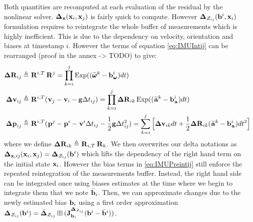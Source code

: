 %
Both quantities are recomputed at each evaluation of the residual by the nonlinear solver. ${\bm \Delta}_{{\bf x}}({\bf x}_i, {\bf x}_j)$ is fairly quick to compute.
However ${\bm \Delta}_{\mathcal{Z}_{ij}}({\bf b}^i, {\bf x}_i)$ formulation requires to reintegrate the whole buffer of measurements which
is highly inefficient. This is due to the dependency on velocity, orientation and biases at timestamp $i$. However the terms of equation \ref{eq:IMUIntij} can 
be rearranged (proof in the annex -> TODO) to give:
%
%
\begin{equation}
    \begin{split}
    {\bm \Delta {\bf R}}_{ij} &\triangleq  \prescript{}{}{{\bf R}}_{}^{i,T} \prescript{}{}{{\bf R}}_{}^{j} =  \prod_{k=i}^{j} \operatorname*{Exp}((\prescript{}{}{\widetilde{\pmb{\omega}}}_{}^k - {\bf b}_{\prescript{}{}{\pmb{\omega}}_{}}^i)dt) \\
    {\bm \Delta {\bf v}}_{ij} &\triangleq \prescript{}{}{{\bf R}}_{}^{i,T} (\prescript{}{}{{\bf v}}_{j} - \prescript{}{}{{\bf v}}_{i} - {\bf g} \Delta t_{ij}) 
    = \prod_{k=i}^{j} {\bm \Delta {\bf R}}_{ik} \operatorname*{Exp}((\prescript{}{}{\widetilde{{\bf a}}}_{}^k - {\bf b}_{\prescript{}{}{{\bf a}}_{}}^i)dt)  \\
    {\bm \Delta {\bf p}}_{ij} &\triangleq \prescript{}{}{{\bf R}}_{}^{i,T}(\prescript{}{}{{\bf p}}_{}^j - \prescript{}{}{{\bf p}}_{}^i - \prescript{}{}{{\bf v}}_{}^i \Delta t_{ij} - \frac{1}{2} {\bf g} \Delta t_{ij}^2) 
    = \sum_{k=i}^{j} \Big[{\bm \Delta {\bf v}}_{ik}dt +  \frac{1}{2} {\bm \Delta {\bf R}}_{ik} (\prescript{}{}{\widetilde{{\bf a}}}_{}^k - {\bf b}_{\prescript{}{}{{\bf a}}_{}}^i)dt^2 \Big]
    \end{split}
    \label{eq:IMUPreintij}
\end{equation}
%
where we define ${\bm \Delta {\bf R}}_{ik} \triangleq \prescript{}{}{{\bf R}}_{i,T} \prescript{}{}{{\bf R}}_{k}$.
We then overwrites our delta notations as ${\bm \Delta}_{{\bf x},ij}({\bf x}_i, {\bf x}_j) = {\bm \Delta}_{\mathcal{Z}_{ij}}({\bf b}^i)$
which lifts the dependency of the right hand term on the initial state ${\bf x}_i$. However the bias terms in \ref{eq:IMUPreintij} still enforce the repeated 
reintegration of the measurements buffer. Instead, the right hand side can be integrated once using biases estimates at the time where we begin to integrate them that
we note $\bar{{\bf b}}_i$. Then, we can approximate changes due to the newly estimated bias ${\bf b}_i$ using a first order approximation 
${\bm \Delta}_{\mathcal{Z}_{ij}}({\bf b}^i) = \bar{{\bm \Delta}}_{\mathcal{Z}_{ij}} \boxplus ({\bf J}^{{\bm \Delta}_{\mathcal{Z}_{ij}}}_{{\bf b}_i} ({\bf b}^i - \bar{{\bf b}}^i))$.


